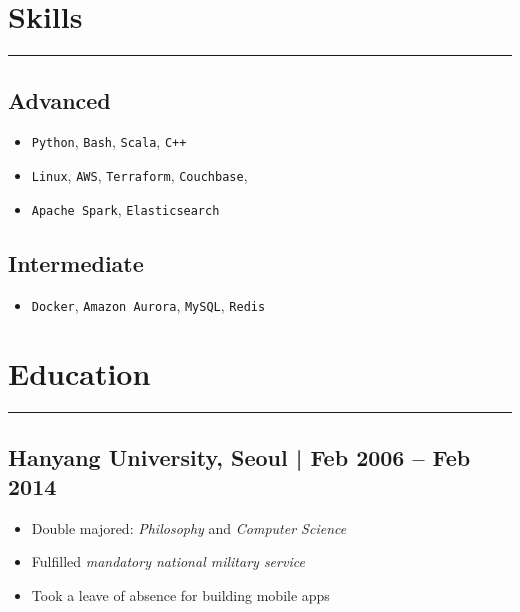 \documentclass[11pt]{article}
\begin{document}
\section*{Skills}
\label{sec:org4d2805a}
\vspace{-4ex}

\noindent\rule{\textwidth}{0.5pt}
\vspace{-4ex}

\subsection*{Advanced}
\label{sec:org9909d2b}
\begin{itemize}
\item \texttt{Python}, \texttt{Bash}, \texttt{Scala}, \texttt{C++}
\item \texttt{Linux}, \texttt{AWS}, \texttt{Terraform}, \texttt{Couchbase},
\item \texttt{Apache Spark}, \texttt{Elasticsearch}
\end{itemize}

\subsection*{Intermediate}
\label{sec:org6d29c63}
\begin{itemize}
\item \texttt{Docker}, \texttt{Amazon Aurora}, \texttt{MySQL}, \texttt{Redis}
\end{itemize}

\section*{Education}
\label{sec:org8ff6c08}
\vspace{-4ex}

\noindent\rule{\textwidth}{0.5pt}
\vspace{-4ex}

\subsection*{Hanyang University, Seoul | Feb 2006 – Feb 2014}
\label{sec:org4697ce5}
\begin{itemize}[label=$\circ$,itemsep=-0.5ex]
\item Double majored: \emph{Philosophy} and \emph{Computer Science}
\item Fulfilled \emph{mandatory national military service}
\item Took a leave of absence for building mobile apps
\end{itemize}
\end{document}
